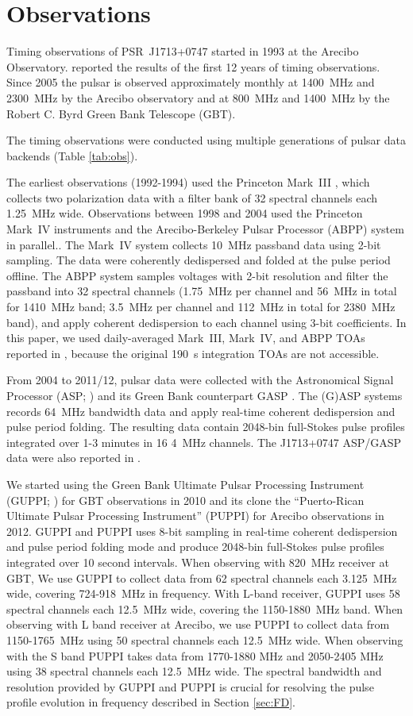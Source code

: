 \section{Observations}
Timing observations of PSR~J1713+0747 started in 1993 at the Arecibo
Observatory. \citet{sns+05} reported the results of the first 12 years
of timing observations. Since 2005 the pulsar is observed approximately monthly
at 1400~MHz and 2300~MHz by the Arecibo
observatory and at 800~MHz and 1400~MHz by the Robert C. Byrd Green Bank
Telescope (GBT).

The timing observations were conducted using multiple generations of pulsar
data backends (Table \ref{tab:obs}).
{\bfref
The earliest observations (1992-1994) used the Princeton Mark~III
\citep{skn+92}, which collects two polarization data with a filter bank of 32
spectral channels each 1.25~MHz wide. 
Observations between 1998 and 2004 used the Princeton Mark~IV
\citep{sst+00} instruments and the Arecibo-Berkeley Pulsar Processor
(ABPP) system \citep{bdz+97} in parallel.. 
The Mark~IV system collects 10~MHz 
passband data using 2-bit sampling. The
data were coherently dedispersed and folded at the pulse period offline.
The ABPP system samples voltages with 2-bit resolution and filter the passband 
into 32 spectral channels (1.75~MHz
per channel and 56~MHz in total for 1410~MHz band; 3.5~MHz per channel and 
112~MHz in total for 2380~MHz band), and apply coherent dedispersion to each
channel using 3-bit coefficients. 
In this paper, we used daily-averaged Mark~III, Mark~IV, and ABPP TOAs reported in \citet{sns+05}, because the original 190~s integration TOAs are not accessible.

From 2004 to 2011/12, pulsar data were collected with the Astronomical Signal
Processor (ASP; \citealt{dem07}) and its Green Bank counterpart GASP \citep{dem07}.
The (G)ASP systems records 64~MHz bandwidth data and apply real-time
coherent dedispersion and pulse period folding. The resulting data contain
2048-bin full-Stokes pulse profiles integrated over 1-3 minutes in 16 4~MHz channels. 
The J1713+0747 ASP/GASP data were also reported in \citet{dfg+13}.

We started using 
the Green Bank Ultimate Pulsar Processing Instrument (GUPPI; \citealt{GUPPI}) for GBT 
observations in 2010 and its clone the ``Puerto-Rican Ultimate Pulsar Processing Instrument''
(PUPPI) for Arecibo observations in 2012. 
GUPPI and PUPPI uses 8-bit sampling in real-time coherent dedispersion and
pulse period folding mode and produce 2048-bin full-Stokes
pulse profiles integrated over 10 second intervals.
When observing with 820~MHz receiver at GBT, We use GUPPI to collect data from 62 spectral 
channels each 3.125~MHz wide, covering 724-918~MHz in frequency. With L-band receiver, GUPPI
uses 58 spectral channels each 12.5~MHz wide, covering the 1150-1880~MHz band. 
When observing with L band receiver at Arecibo, we use PUPPI to collect data from 1150-1765~MHz
using 50 spectral channels each 12.5~MHz wide. When observing with the S band
PUPPI takes data from 1770-1880 MHz and 2050-2405 MHz using 38 spectral
channels each 12.5~MHz wide.
The spectral bandwidth and resolution provided by GUPPI and PUPPI is crucial for resolving the pulse profile evolution in frequency described in Section \ref{sec:FD}.

}
